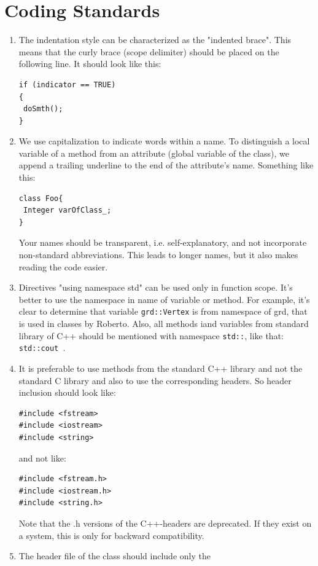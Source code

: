 \documentclass{article}
\begin{document}
\section*{Coding Standards}
\begin{enumerate}
\item[\textbf{Indentation style}] The indentation style can be characterized as the
     "indented brace". This means that the curly brace (scope delimiter) should
     be placed on the following line. It should look like this:
\begin{verbatim}
if (indicator == TRUE)
{
 doSmth();
}
\end{verbatim}
\item[\textbf{Names}] We use capitalization to indicate words within a name. To
     distinguish a local variable of a method from an attribute (global
     variable of the class), we append a trailing underline to the end of the
     attribute's name. Something like this:
\begin{verbatim}
class Foo{
 Integer varOfClass_;
}
\end{verbatim}
     Your names should be transparent, i.e. self-explanatory, and not
     incorporate non-standard abbreviations. This leads to longer names, but
     it also makes reading the code easier.
\item[\textbf{using namespace}] Directives "using namespace std" can be used only
     in function scope. It's better to use the namespace in name of variable or method. For example, it's clear to determine that variable {\tt grd::Vertex} is from namespace of grd, that is used in classes by Roberto. Also, all methods iand variables from standard library of {C++} should be mentioned with namespace {\tt std::}, like that: {\tt std::cout }. 
\item[\textbf{C++ standard libraries}] It is preferable to use methods from the
     standard C++ library and not the standard C library and also to use the
     corresponding headers. So header inclusion should look like:
\begin{verbatim}
#include <fstream>
#include <iostream>
#include <string>
\end{verbatim}
and not like:
\begin{verbatim}
#include <fstream.h>
#include <iostream.h>
#include <string.h>
\end{verbatim}
     Note that the .h versions of the C++-headers are deprecated. If they exist
     on a system, this is only for backward compatibility.
\item[\textbf{\#include}] The header file of the class should include only the

\end{enumerate}
\end{document}
